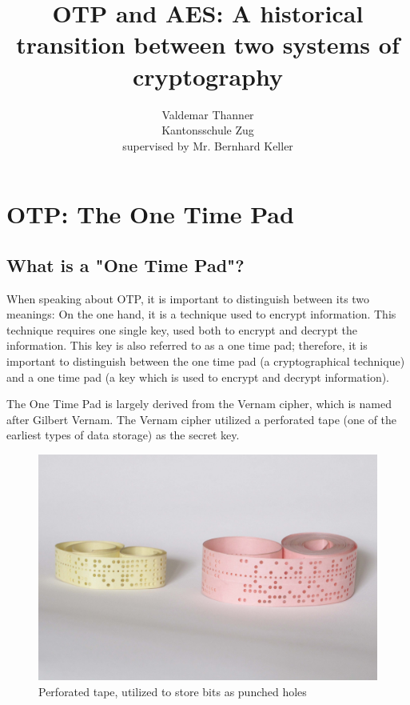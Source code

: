 \documentclass[12pt]{report}
\begin{document}
\title{OTP and AES: A historical transition between two systems of cryptography}
\author{Valdemar Thanner\\Kantonsschule Zug\\supervised by Mr. Bernhard Keller}
\maketitle

\tableofcontents

\chapter{OTP: The One Time Pad}

\section{What is a "One Time Pad"?}
When speaking about OTP, it is important to distinguish between its two meanings: On the one hand, it is a technique used to encrypt information. This technique requires one single key, used both to encrypt and decrypt the information. This key is also referred to as a one time pad; therefore, it is important to distinguish between the one time pad (a cryptographical technique) and a one time pad (a key which is used to encrypt and decrypt information).

The One Time Pad is largely derived from the Vernam cipher, which is named after Gilbert Vernam. The Vernam cipher utilized a perforated tape (one of the earliest types of data storage) as the secret key\cite{vernampatent}.

\begin{figure}[H]
\centering
\includegraphics[scale=0.5]{PerforatedTape}
\caption{Perforated tape, utilized to store bits as punched holes}
\end{figure}
\end{document}
